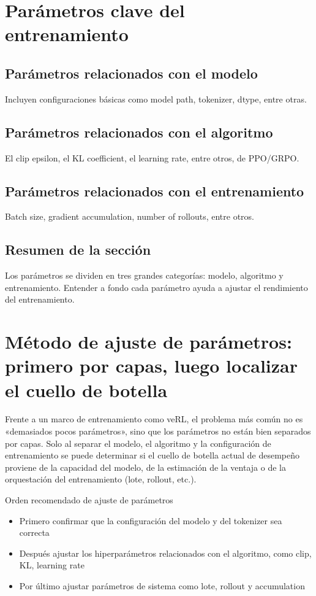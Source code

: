 \documentclass[a4paper]{article}
\begin{document}
\section{Parámetros clave del entrenamiento}
\subsection{Parámetros relacionados con el modelo}
Incluyen configuraciones básicas como model path, tokenizer, dtype, entre otras.

\subsection{Parámetros relacionados con el algoritmo}
El clip epsilon, el KL coefficient, el learning rate, entre otros, de PPO/GRPO.

\subsection{Parámetros relacionados con el entrenamiento}
Batch size, gradient accumulation, number of rollouts, entre otros.

\subsection{Resumen de la sección}
Los parámetros se dividen en tres grandes categorías: modelo, algoritmo y entrenamiento. Entender a fondo cada parámetro ayuda a ajustar el rendimiento del entrenamiento.

\newpage
\section{Método de ajuste de parámetros: primero por capas, luego localizar el cuello de botella}
Frente a un marco de entrenamiento como veRL, el problema más común no es «demasiados pocos parámetros», sino que los parámetros no están bien separados por capas. Solo al separar el modelo, el algoritmo y la configuración de entrenamiento se puede determinar si el cuello de botella actual de desempeño proviene de la capacidad del modelo, de la estimación de la ventaja o de la orquestación del entrenamiento (lote, rollout, etc.).

\begin{knowledgebox}{Orden recomendado de ajuste de parámetros}
\begin{itemize}
  \item Primero confirmar que la configuración del modelo y del tokenizer sea correcta
  \item Después ajustar los hiperparámetros relacionados con el algoritmo, como clip, KL, learning rate
  \item Por último ajustar parámetros de sistema como lote, rollout y accumulation
\end{itemize}
\end{knowledgebox}
\end{document}
